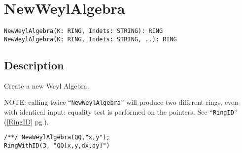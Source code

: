 \documentclass[a4paper]{mybook}
\newenvironment{command}{}{} %
\begin{document}
\section{NewWeylAlgebra}
\label{NewWeylAlgebra}
\begin{command} %


\begin{Verbatim}[label=syntax, rulecolor=\color{MidnightBlue},
frame=single]
NewWeylAlgebra(K: RING, Indets: STRING): RING
NewWeylAlgebra(K: RING, Indets: STRING, ..): RING
\end{Verbatim}


\subsection*{Description}

Create a new Weyl Algebra.
\par 
NOTE: calling twice ``\verb&NewWeylAlgebra&'' will produce
two different rings, even with identical input: equality test is
performed on the pointers.  See ``\verb&RingID&'' (\ref{RingID} pg.\pageref{RingID}).

\begin{Verbatim}[label=example, rulecolor=\color{PineGreen}, frame=single]
/**/ NewWeylAlgebra(QQ,"x,y");
RingWithID(3, "QQ[x,y,dx,dy]")
\end{Verbatim}


\end{command} %
\end{document}

